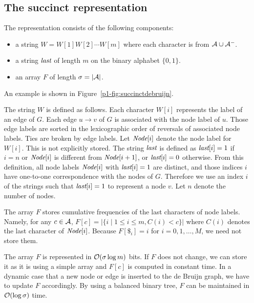\subsection{The succinct representation}

The representation consists of the following components:
\begin{itemize}
\item a string $W = W[1] W[2] \cdots W[m]$ where each character is from ${\cal A} \cup {\cal A}^-$.
\item a string ${\textit{last}}$ of length $m$ on the binary alphabet $\{0,1\}$.
\item an array $F$ of length $\sigma = |{\cal A}|$.
\end{itemize}
An example is shown in Figure~\ref{p1-fig:succinctdebruijn}.

The string $W$ is defined as follows.
Each character $W[i]$ represents the label of an edge of $G$. Each edge $u \rightarrow v$ of $G$ is associated with the node label of $u$. Those edge labels are sorted in the lexicographic order of reversals of associated node labels. Ties are broken by edge labels. Let ${\textit{Node}}[i]$ denote the node label for $W[i]$.  This is not explicitly stored.
The string ${\textit{last}}$ is defined as
${\textit{last}}[i] = 1$ if $i = n$ or ${\textit{Node}}[i]$ is different from ${\textit{Node}}[i+1]$,
or ${\textit{last}}[i] = 0$ otherwise.  From this definition,
all node labels ${\textit{Node}}[i]$ with ${\textit{last}}[i] = 1$ are distinct, and
those indices $i$ have one-to-one correspondence with the nodes of $G$.
Therefore we use an index $i$ of the strings such that ${\textit{last}}[i] = 1$
to represent a node $v$.  
Let $n$ denote the number of nodes.

The array $F$ stores cumulative frequencies of the last characters of node labels.
Namely, for any $c \in {\cal A}$, 
$F[c] = |\{i \mid 1 \le i \le m, C(i) < c  \}|$ where $C(i)$ denotes the last character of ${\textit{Node}}[i]$.
Because $F[\$_i] = i$ for $i = 0,1,\ldots,M$, we need not store them.

The array $F$ is represented in $\mathcal{O}(\sigma \log m)$ bits.
If $F$ does not change, we can store it as it is using a simple array and $F[c]$ is computed
in constant time.
In a dynamic case that a new node or edge is inserted to the de Bruijn graph,
we have to update $F$ accordingly.  By using a balanced binary tree, $F$ can be maintained
in $\mathcal{O}(\log \sigma)$ time.

